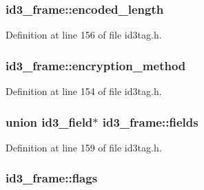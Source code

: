 \subsubsection[{\texorpdfstring{encoded\+\_\+length}{encoded_length}}]{ id3\+\_\+frame\+::encoded\+\_\+length}\hypertarget{structid3__frame_aeb2c6f15900cad9a304d158030a534b6}{}\label{structid3__frame_aeb2c6f15900cad9a304d158030a534b6}


Definition at line 156 of file id3tag.\+h.

\subsubsection[{\texorpdfstring{encryption\+\_\+method}{encryption_method}}]{ id3\+\_\+frame\+::encryption\+\_\+method}\hypertarget{structid3__frame_aa77e084d603d355de243111563dcdae3}{}\label{structid3__frame_aa77e084d603d355de243111563dcdae3}


Definition at line 154 of file id3tag.\+h.

\subsubsection[{\texorpdfstring{fields}{fields}}]{\setlength{\rightskip}{0pt plus 5cm}union {\bf id3\+\_\+field}$\ast$ id3\+\_\+frame\+::fields}\hypertarget{structid3__frame_a118d6c04856e00ce9ae72092118ffacb}{}\label{structid3__frame_a118d6c04856e00ce9ae72092118ffacb}


Definition at line 159 of file id3tag.\+h.

\subsubsection[{\texorpdfstring{flags}{flags}}]{ id3\+\_\+frame\+::flags}\hypertarget{structid3__frame_aa6b4189081db1142834d5074a9a1ca0a}{}\label{structid3__frame_aa6b4189081db1142834d5074a9a1ca0a}


